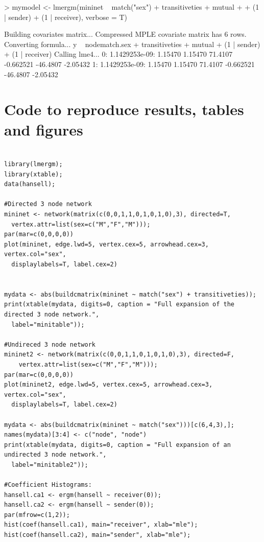 \documentclass[a4paper]{article}
\begin{document}
\begin{appendices}
\begin{Schunk}
\begin{Sinput}
> mymodel <- lmergm(mininet ~ match("sex") + transitiveties + mutual + 
+     (1 | sender) + (1 | receiver), verbose = T)
\end{Sinput}
\begin{Soutput}
Building covariates matrix...
Compressed MPLE covariate matrix has 6 rows.
Converting formula...
y ~  nodematch.sex + transitiveties + mutual + (1 | sender) + (1 | receiver) 
Calling lme4...
  0: 1.1429253e-09:  1.15470  1.15470  71.4107 -0.662521 -46.4807 -2.05432
  1: 1.1429253e-09:  1.15470  1.15470  71.4107 -0.662521 -46.4807 -2.05432
\end{Soutput}
\end{Schunk}

\section{Code to reproduce results, tables and figures}
\label{appendix.code}

\begin{verbatim}

library(lmergm);
library(xtable);
data(hansell);

#Directed 3 node network
mininet <- network(matrix(c(0,0,1,1,0,1,0,1,0),3), directed=T, 
  vertex.attr=list(sex=c("M","F","M")));
par(mar=c(0,0,0,0))
plot(mininet, edge.lwd=5, vertex.cex=5, arrowhead.cex=3, vertex.col="sex", 
  displaylabels=T, label.cex=2)


mydata <- abs(buildcmatrix(mininet ~ match("sex") + transitiveties));
print(xtable(mydata, digits=0, caption = "Full expansion of the directed 3 node network.", 
  label="minitable"));
	
#Undireced 3 node network	
mininet2 <- network(matrix(c(0,0,1,1,0,1,0,1,0),3), directed=F, 
	vertex.attr=list(sex=c("M","F","M")));
par(mar=c(0,0,0,0))
plot(mininet2, edge.lwd=5, vertex.cex=5, arrowhead.cex=3, vertex.col="sex", 
  displaylabels=T, label.cex=2)	
	
mydata <- abs(buildcmatrix(mininet ~ match("sex")))[c(6,4,3),];
names(mydata)[3:4] <- c("node", "node")
print(xtable(mydata, digits=0, caption = "Full expansion of an undirected 3 node network.", 
  label="minitable2"));	

#Coefficient Histograms:	
hansell.ca1 <- ergm(hansell ~ receiver(0));
hansell.ca2 <- ergm(hansell ~ sender(0));
par(mfrow=c(1,2));
hist(coef(hansell.ca1), main="receiver", xlab="mle");
hist(coef(hansell.ca2), main="sender", xlab="mle");


\end{verbatim}
\end{appendices}
\end{document}
